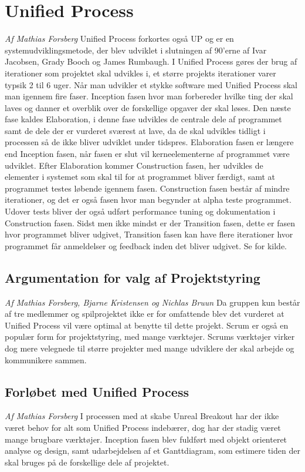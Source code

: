 \section{Unified Process}
\textit{Af Mathias Forsberg}\newline
Unified Process forkortes også UP og er en systemudviklingsmetode, der blev udviklet i slutningen af 90'erne af Ivar Jacobsen, Grady Booch og James Rumbaugh. I Unified Process gøres der brug af iterationer som projektet skal udvikles i, et større projekts iterationer varer typsik 2 til 6 uger. Når man udvikler et stykke software med Unified Process skal man igennem fire faser. Inception fasen hvor man forbereder hvilke ting der skal laves og danner et overblik over de forskellige opgaver der skal løses. Den næste fase kaldes Elaboration, i denne fase udvikles de centrale dele af programmet samt de dele der er vurderet sværest at lave, da de skal udvikles tidligt i processen så de ikke bliver udviklet under tidspres. Elaboration fasen er længere end Inception fasen, når fasen er slut vil kerneelementerne af programmet være udviklet. Efter Elaboration kommer Construction fasen, her udvikles de elementer i systemet som skal til for at programmet bliver færdigt, samt at programmet testes løbende igennem fasen. Construction fasen består af mindre iterationer, og det er også fasen hvor man begynder at alpha teste programmet. Udover tests bliver der også udført performance tuning og dokumentation i Construction fasen. Sidst men ikke mindst er der Transition fasen, dette er fasen hvor programmet bliver udgivet, Transition fasen kan have flere iterationer hvor programmet får anmeldelser og feedback inden det bliver udgivet.\newline
Se \cite[chap. 9]{Larman200308} for kilde. \newline
\newline
\subsection{Argumentation for valg af Projektstyring}
\textit{Af Mathias Forsberg, Bjarne Kristensen og Nichlas Bruun}\newline
Da gruppen kun består af tre medlemmer og spilprojektet ikke er for omfattende blev det vurderet at Unified Process vil være optimal at benytte til dette projekt. Scrum er også en populær form for projektstyring, med mange værktøjer. Scrums værktøjer virker dog mere velegnede til større projekter med mange udviklere der skal arbejde og kommunikere sammen.
\subsection{Forløbet med Unified Process}
\textit{Af Mathias Forsberg}\newline
I processen med at skabe Unreal Breakout har der ikke været behov for alt som Unified Process indebærer, dog har der stadig været mange brugbare værktøjer. Inception fasen blev fuldført med objekt orienteret analyse og design, samt udarbejdelsen af et Ganttdiagram, som estimere tiden der skal bruges på de forskellige dele af projektet. 

